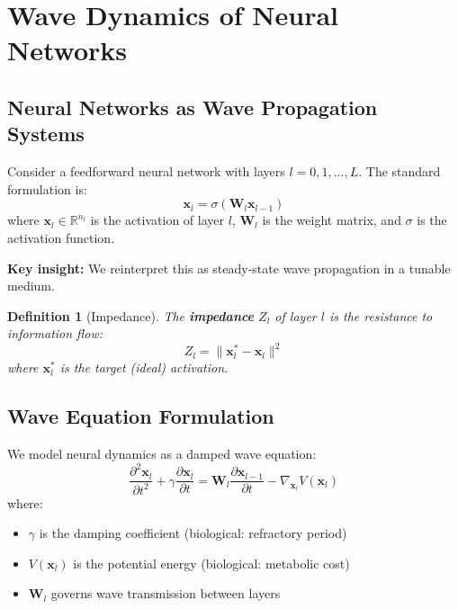 \documentclass{article}
\newtheorem{definition}[theorem]{Definition}
\begin{document}
\section{Wave Dynamics of Neural Networks}
\label{sec:wave_derivation}

\subsection{Neural Networks as Wave Propagation Systems}

Consider a feedforward neural network with layers $l = 0, 1, \ldots, L$. The standard formulation is:
\begin{equation}
\mathbf{x}_l = \sigma(\mathbf{W}_l \mathbf{x}_{l-1})
\end{equation}
where $\mathbf{x}_l \in \mathbb{R}^{n_l}$ is the activation of layer $l$, $\mathbf{W}_l$ is the weight matrix, and $\sigma$ is the activation function.

\textbf{Key insight:} We reinterpret this as steady-state wave propagation in a tunable medium.

\begin{definition}[Impedance]
The \textbf{impedance} $Z_l$ of layer $l$ is the resistance to information flow:
\begin{equation}
Z_l = \|\mathbf{x}_l^* - \mathbf{x}_l\|^2
\end{equation}
where $\mathbf{x}_l^*$ is the target (ideal) activation.
\end{definition}

\subsection{Wave Equation Formulation}

We model neural dynamics as a damped wave equation:
\begin{equation}
\frac{\partial^2 \mathbf{x}_l}{\partial t^2} + \gamma \frac{\partial \mathbf{x}_l}{\partial t} = \mathbf{W}_l \frac{\partial \mathbf{x}_{l-1}}{\partial t} - \nabla_{\mathbf{x}_l} V(\mathbf{x}_l)
\label{eq:wave_eq}
\end{equation}
where:
\begin{itemize}
\item $\gamma$ is the damping coefficient (biological: refractory period)
\item $V(\mathbf{x}_l)$ is the potential energy (biological: metabolic cost)
\item $\mathbf{W}_l$ governs wave transmission between layers
\end{itemize}
\end{document}
